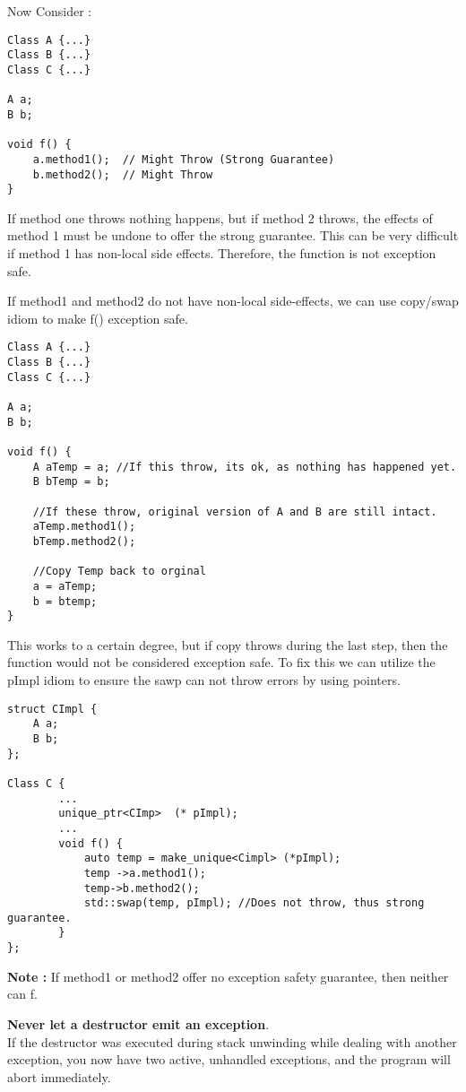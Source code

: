 \documentclass{article}
\newenvironment{ablock}[1]{%
    \tcolorbox[beamer,%
    noparskip,breakable,
    colback=lightcoral,colframe=darkred,%
    colbacklower=tomato!75!lightcoral,%
    title=#1]}%
    {\endtcolorbox}
\begin{document}
Now Consider : 
\begin{lstlisting}
Class A {...}
Class B {...}
Class C {...}

A a;
B b;

void f() {
	a.method1();  // Might Throw (Strong Guarantee)
	b.method2();  // Might Throw
}
\end{lstlisting}

If method one throws nothing happens, but if method 2 throws, the effects of method 1 must be undone to offer the strong guarantee. This can be very difficult if method 1 has non-local side effects. Therefore, the function is not exception safe. 

If method1 and method2 do not have non-local side-effects, we can use copy/swap idiom to make f() exception safe. 

\begin{lstlisting}
Class A {...}
Class B {...}
Class C {...}

A a;
B b;

void f() {
	A aTemp = a; //If this throw, its ok, as nothing has happened yet.
	B bTemp = b;
	
	//If these throw, original version of A and B are still intact. 
	aTemp.method1();
	bTemp.method2();
	
	//Copy Temp back to orginal 
	a = aTemp;
	b = btemp;
}
\end{lstlisting}

This works to a certain degree, but if copy throws during the last step, then the function would not be considered exception safe. To fix this we can utilize the pImpl idiom to ensure the sawp can not throw errors by using pointers.

\begin{lstlisting}
struct CImpl {
	A a;
	B b;
};

Class C {
		...
		unique_ptr<CImp>  (* pImpl);
		...
		void f() {
			auto temp = make_unique<Cimpl> (*pImpl);
			temp ->a.method1();
			temp->b.method2();
			std::swap(temp, pImpl); //Does not throw, thus strong guarantee.
		}
};
\end{lstlisting}

\textbf{Note : } If method1 or method2 offer no exception safety guarantee, then neither can f. 

\begin{ablock}{Warning}
\textbf{Never  let a destructor emit an exception}. \\
If the destructor was executed during stack unwinding while dealing with another exception, you now have two active, unhandled exceptions, and the program will abort immediately. 
\end{ablock}
\end{document}
